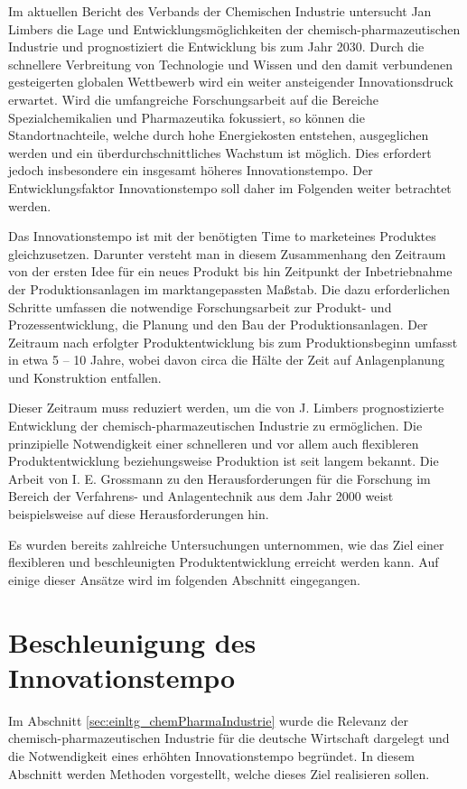 Im aktuellen Bericht des Verbands der Chemischen Industrie  untersucht Jan Limbers die Lage und Entwicklungsm\"oglichkeiten der chemisch-pharmazeutischen Industrie und prognostiziert die Entwicklung bis zum Jahr 2030. Durch die schnellere Verbreitung von Technologie und Wissen und den damit verbundenen gesteigerten globalen Wettbewerb wird ein weiter ansteigender Innovationsdruck erwartet. Wird die umfangreiche Forschungsarbeit auf die Bereiche Spezialchemikalien und Pharmazeutika fokussiert, so k\"onnen die Standortnachteile, welche durch hohe Energiekosten entstehen, ausgeglichen werden und ein \"uberdurchschnittliches Wachstum ist m\"oglich. Dies erfordert jedoch insbesondere ein insgesamt h\"oheres Innovationstempo. Der Entwicklungsfaktor Innovationstempo soll daher im Folgenden weiter betrachtet werden. \cite{PerspektiveC_2016} \hfill \newline

Das Innovationstempo ist mit der ben\"otigten \glqq Time to market\grqq { }eines Produktes gleichzusetzen. Darunter versteht man in diesem Zusammenhang den Zeitraum von der ersten Idee f\"ur ein neues Produkt bis hin Zeitpunkt der Inbetriebnahme der Produktionsanlagen im marktangepassten Ma\ss{}stab. Die dazu erforderlichen Schritte umfassen die notwendige Forschungsarbeit zur Produkt- und Prozessentwicklung, die Planung und den Bau der Produktionsanlagen. Der Zeitraum nach erfolgter Produktentwicklung bis zum Produktionsbeginn umfasst in etwa 5 -- 10 Jahre, wobei davon circa die H\"alte der Zeit auf Anlagenplanung und Konstruktion entfallen. \cite{Schembecker_2009}

Dieser Zeitraum muss reduziert werden, um die von J. Limbers prognostizierte Entwicklung der chemisch-pharmazeutischen Industrie zu erm\"oglichen. \hfill \newline
Die prinzipielle Notwendigkeit einer schnelleren und vor allem auch flexibleren Produktentwicklung beziehungsweise Produktion ist seit langem bekannt. Die Arbeit von I. E. Grossmann zu den Herausforderungen f\"ur die Forschung im Bereich der Verfahrens- und Anlagentechnik aus dem Jahr 2000 weist beispielsweise auf diese Herausforderungen hin. \cite{Grossmann_2000} \hfill \newline

Es wurden bereits zahlreiche Untersuchungen unternommen, wie das Ziel einer flexibleren und  beschleunigten Produktentwicklung erreicht werden kann. Auf einige dieser Ans\"atze wird im folgenden Abschnitt eingegangen. 

\section{Beschleunigung des Innovationstempo}\label{sec:einltg_beschlngInnovationstempo}
Im Abschnitt \ref{sec:einltg_chemPharmaIndustrie} wurde die Relevanz der chemisch-pharmazeutischen Industrie f\"ur die deutsche Wirtschaft dargelegt und die Notwendigkeit eines erh\"ohten Innovationstempo begr\"undet. In diesem Abschnitt werden Methoden vorgestellt, welche dieses Ziel realisieren sollen. \hfill \newline

